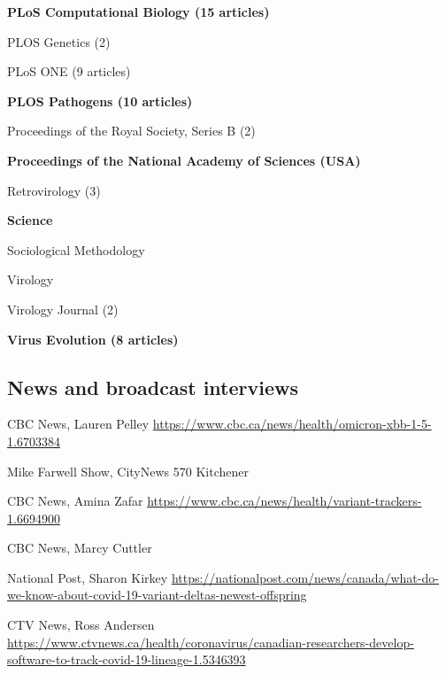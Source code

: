 {\begin{cvitemize}
\item \textbf{PLoS Computational Biology     (15 articles)}
\item PLOS Genetics (2)
\item PLoS ONE   (9 articles)
\item \textbf{PLOS Pathogens   (10 articles)}
\item Proceedings of the Royal Society, Series B    (2)
\item \textbf{Proceedings of the National Academy of Sciences (USA)}
\item Retrovirology                                 (3)
\item \textbf{Science} 
\item Sociological Methodology                      
\item Virology                                      
\item Virology Journal                              (2)
\item \textbf{Virus Evolution           (8 articles)}
\end{cvitemize}
}


\subsection {News and broadcast interviews}

{CBC News, Lauren Pelley}
{\url{https://www.cbc.ca/news/health/omicron-xbb-1-5-1.6703384}}
{}{}

{Mike Farwell Show, CityNews 570 Kitchener}
{}
{}{}


{CBC News, Amina Zafar}
{\url{https://www.cbc.ca/news/health/variant-trackers-1.6694900}}
{}{}

{CBC News, Marcy Cuttler}
{}{}{}


{National Post, Sharon Kirkey}
{\url{https://nationalpost.com/news/canada/what-do-we-know-about-covid-19-variant-deltas-newest-offspring}}
{}{}

{CTV News, Ross Andersen}
{\url{https://www.ctvnews.ca/health/coronavirus/canadian-researchers-develop-software-to-track-covid-19-lineage-1.5346393}}
{}{}

